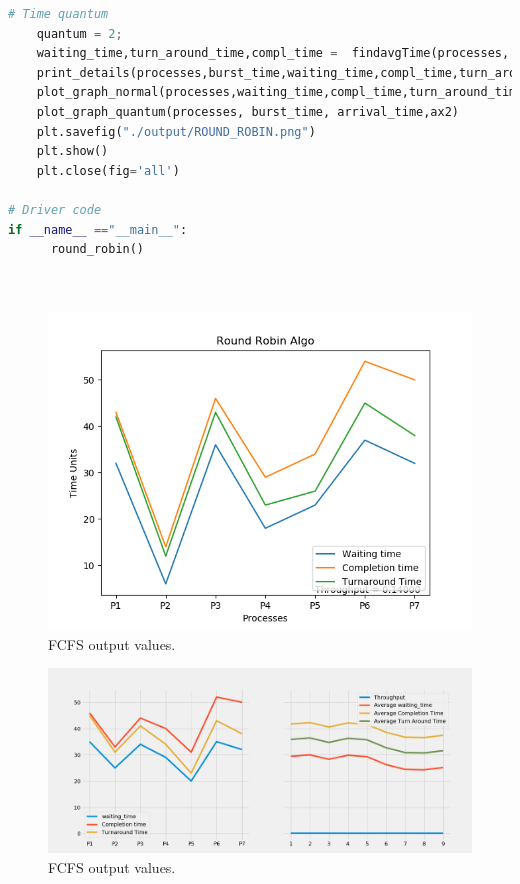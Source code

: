\documentclass[11pt,a4paper]{report}
\begin{document}
\begin{lstlisting}[language=Python,caption = Round Robin Source Code,breaklines=true,postbreak=\mbox{\textcolor{red}{$\hookrightarrow$}\space},]
    # Time quantum  
    quantum = 2;  
    waiting_time,turn_around_time,compl_time =  findavgTime(processes, len(processes), burst_time, arrival_time, quantum) 
    print_details(processes,burst_time,waiting_time,compl_time,turn_around_time)
    plot_graph_normal(processes,waiting_time,compl_time,turn_around_time,ax1)
    plot_graph_quantum(processes, burst_time, arrival_time,ax2)
    plt.savefig("./output/ROUND_ROBIN.png")
    plt.show()
    plt.close(fig='all')

# Driver code  
if __name__ =="__main__": 
      round_robin()

  
\end{lstlisting}
\begin{figure}[H]
	\centering
	\includegraphics[scale=0.8]{./img/ROUND_ROBIN_output.png}
	\caption{FCFS output values.}
\end{figure}

\begin{figure}[H]

	\includegraphics[scale=0.4]{./img/ROUND_ROBIN.png}
	\caption{FCFS output values.}
\end{figure}
\end{document}
